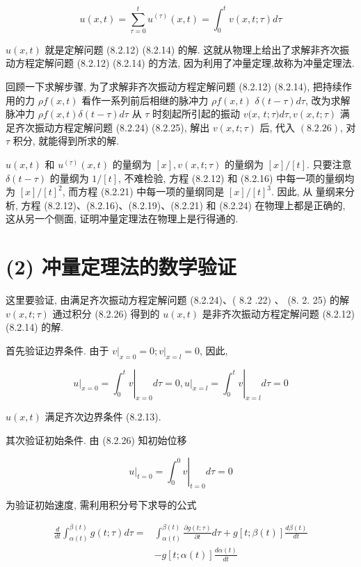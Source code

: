 $$
u(x, t)=\sum_{\tau=0}^{t} u^{(\tau)}(x, t)=\int_{0}^{t} v(x, t ; \tau) d \tau
$$

$u(x, t)$ 就是定解问题 (8.2.12) (8.2.14) 的解. 这就从物理上给出了求解非齐次振动方程定解问题 (8.2.12) (8.2.14) 的方法, 因为利用了冲量定理,故称为冲量定理法.

回顾一下求解步骤, 为了求解非齐次振动方程定解问题 (8.2.12) (8.2.14), 把持续作用的力 $\rho f(x, t)$ 看作一系列前后相继的脉冲力 $\rho f(x, t)$ $\delta(t-\tau) d \tau$, 改为求解脉冲力 $\rho f(x, t) \delta(t-\tau) d \tau$ 从 $\tau$ 时刻起所引起的振动 $v(x$, $t ; \tau) d \tau, v(x, t ; \tau)$ 满足齐次振动方程定解问题 (8.2.24) (8.2.25), 解出 $v(x, t ; \tau)$ 后, 代入 $(8.2 .26)$, 对 $\tau$ 积分, 就能得到所求的解.

$u(x, t)$ 和 $u^{(\tau)}(x, t)$ 的量纲为 $[x], v(x, t ; \tau)$ 的量纲为 $[x] /[t]$. 只要注意 $\delta(t-\tau)$ 的量纲为 $1 /[t]$, 不难检验, 方程 (8.2.12) 和 (8.2.16) 中每一项的量纲均为 $[x] /[t]^{2}$, 而方程 (8.2.21) 中每一项的量纲同是 $[x] /[t]^{3}$. 因此, 从
量纲来分析, 方程 (8.2.12)、(8.2.16)、(8.2.19)、(8.2.21) 和 (8.2.24) 在物理上都是正确的, 这从另一个侧面, 证明冲量定理法在物理上是行得通的.

\section{(2) 冲量定理法的数学验证}
这里要验证, 由满足齐次振动方程定解问题 (8.2.24)、( 8.2 .22$)$ 、 (8. 2. 25) 的解 $v(x, t ; \tau)$ 通过积分 (8.2.26) 得到的 $u(x, t)$ 是非齐次振动方程定解问题 (8.2.12) (8.2.14) 的解.

首先验证边界条件. 由于 $\left.v\right|_{x=0}=0 ;\left.v\right|_{x=l}=0$, 因此,

$$
\left.u\right|_{x=0}=\left.\int_{0}^{t} v\right|_{x=0} d \tau=0,\left.u\right|_{x=l}=\left.\int_{0}^{t} v\right|_{x=l} d \tau=0
$$

$u(x, t)$ 满足齐次边界条件 (8.2.13).

其次验证初始条件. 由 (8.2.26) 知初始位移

$$
\left.u\right|_{t=0}=\left.\int_{0}^{0} v\right|_{t=0} d \tau=0
$$

为验证初始速度, 需利用积分号下求导的公式

$$
\begin{aligned}
\frac{d}{d t} \int_{\alpha(t)}^{\beta(t)} g(t ; \tau) d \tau= & \int_{\alpha(t)}^{\beta(t)} \frac{\partial g(t ; \tau)}{\partial t} d \tau+g[t ; \beta(t)] \frac{d \beta(t)}{d t} \\
& -g[t ; \alpha(t)] \frac{d \alpha(t)}{d t}
\end{aligned}
$$

